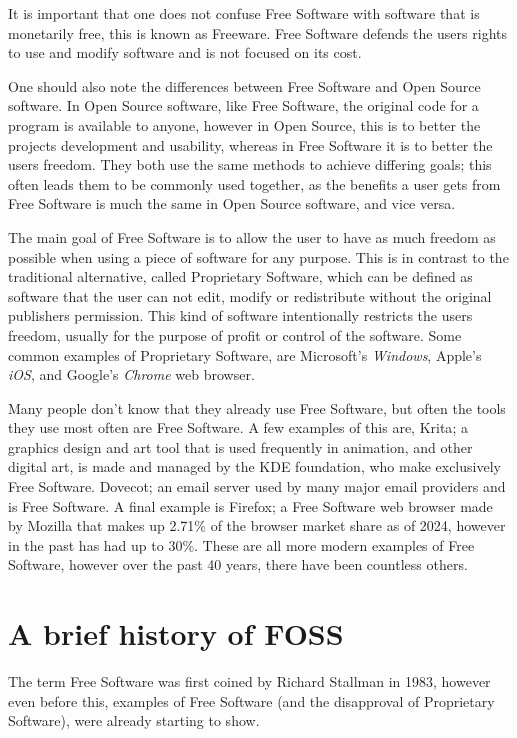 \documentclass[a4paper,12pt]{article}
\begin{document}
{It is important that one does not confuse Free Software with software that is monetarily free, this is known as
Freeware. Free Software defends the users rights to use and modify software and is not focused on its cost.

One should also note the differences between Free Software and Open Source software. In Open Source software,
like Free Software, the original code for a program is available to anyone, however in Open Source, this is to
better the projects development and usability, whereas in Free Software it is to better the users freedom. They
both use the same methods to achieve differing goals; this often leads them to be commonly used together, as the
benefits a user gets from Free Software is much the same in Open Source software, and vice versa.

The main goal of Free Software is to allow the user to have as much freedom as possible when using a piece of
software for any purpose. This is in contrast to the traditional alternative, called Proprietary Software, which
can be defined as software that the user can not edit, modify or redistribute without the original publishers
permission. This kind of software intentionally restricts the users freedom, usually for the purpose of profit or
control of the software. Some common examples of Proprietary Software, are Microsoft's \textit{Windows}, Apple's
\textit{iOS}, and Google's \textit{Chrome} web browser.

Many people don't know that they already use Free Software\cite{COMMONfoss}, but often the tools they use most
often are Free Software. A few examples of this are, Krita\cite{KRITA}; a graphics design and art tool that is
used frequently in animation, and other digital art, is made and managed by the KDE foundation\cite{KDE}, who make
exclusively Free Software. Dovecot\cite{DOVECOT}; an email server used by many major email providers and is Free
Software. A final example is Firefox\cite{FIREFOX}; a Free Software web browser made by Mozilla that makes up 2.71\%
of the browser market share as of 2024, however in the past has had up to 30\%\cite{BROWSERmarketshare}. These
are all more modern examples of Free Software, however over the past 40 years, there have been countless others.

\section{A brief history of FOSS} The term Free Software was first coined by Richard Stallman in 1983\cite{GNUproject},
however even before this, examples of Free Software (and the disapproval of Proprietary Software), were already
starting to show.

}
\end{document}
